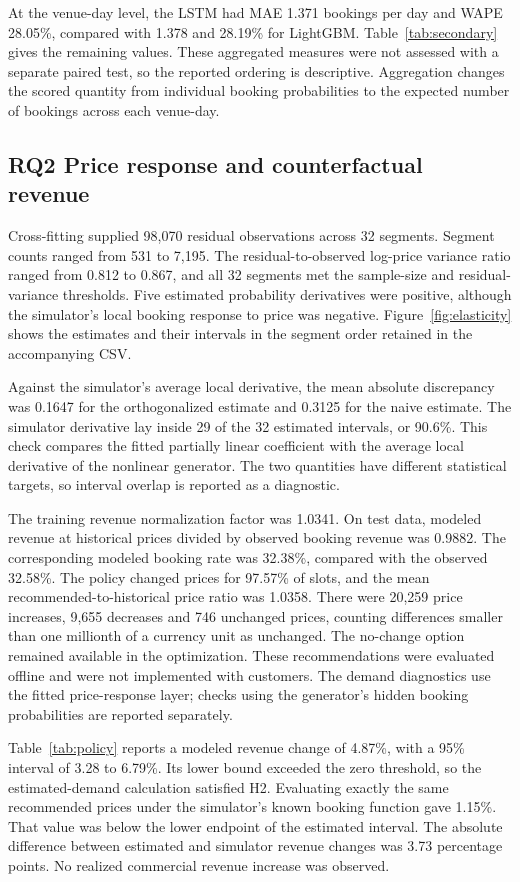 At the venue-day level, the LSTM had MAE 1.371 bookings per day and WAPE 28.05\%, compared with 1.378 and 28.19\% for LightGBM. Table~\ref{tab:secondary} gives the remaining values. These aggregated measures were not assessed with a separate paired test, so the reported ordering is descriptive. Aggregation changes the scored quantity from individual booking probabilities to the expected number of bookings across each venue-day.

\subsection{RQ2 Price response and counterfactual revenue}
Cross-fitting supplied 98,070 residual observations across 32 segments. Segment counts ranged from 531 to 7,195. The residual-to-observed log-price variance ratio ranged from 0.812 to 0.867, and all 32 segments met the sample-size and residual-variance thresholds. Five estimated probability derivatives were positive, although the simulator's local booking response to price was negative. Figure~\ref{fig:elasticity} shows the estimates and their intervals in the segment order retained in the accompanying CSV.

Against the simulator's average local derivative, the mean absolute discrepancy was 0.1647 for the orthogonalized estimate and 0.3125 for the naive estimate. The simulator derivative lay inside 29 of the 32 estimated intervals, or 90.6\%. This check compares the fitted partially linear coefficient with the average local derivative of the nonlinear generator. The two quantities have different statistical targets, so interval overlap is reported as a diagnostic.

The training revenue normalization factor was 1.0341. On test data, modeled revenue at historical prices divided by observed booking revenue was 0.9882. The corresponding modeled booking rate was 32.38\%, compared with the observed 32.58\%. The policy changed prices for 97.57\% of slots, and the mean recommended-to-historical price ratio was 1.0358. There were 20,259 price increases, 9,655 decreases and 746 unchanged prices, counting differences smaller than one millionth of a currency unit as unchanged. The no-change option remained available in the optimization. These recommendations were evaluated offline and were not implemented with customers. The demand diagnostics use the fitted price-response layer; checks using the generator's hidden booking probabilities are reported separately.

Table~\ref{tab:policy} reports a modeled revenue change of 4.87\%, with a 95\% interval of 3.28 to 6.79\%. Its lower bound exceeded the zero threshold, so the estimated-demand calculation satisfied H2. Evaluating exactly the same recommended prices under the simulator's known booking function gave 1.15\%. That value was below the lower endpoint of the estimated interval. The absolute difference between estimated and simulator revenue changes was 3.73 percentage points. No realized commercial revenue increase was observed.



